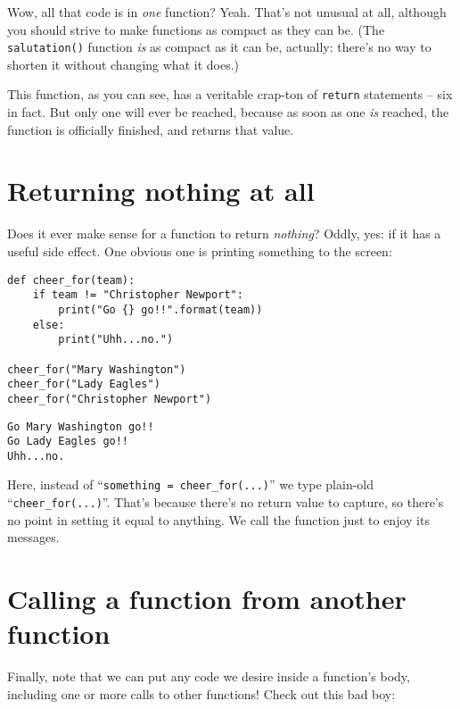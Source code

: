 Wow, all that code is in \textit{one} function? Yeah. That's not unusual at
all, although you should strive to make functions as compact as they can be.
(The \texttt{salutation()} function \textit{is} as compact as it can be,
actually: there's no way to shorten it without changing what it does.)


This function, as you can see, has a veritable crap-ton of \texttt{return}
statements -- six in fact. But only one will ever be reached, because as soon
as one \textit{is} reached, the function is officially finished, and returns
that value.

\section{Returning nothing at all}

Does it ever make sense for a function to return \textit{nothing}? Oddly, yes:
if it has a useful side effect. One obvious one is printing something to the
screen:

\begin{Verbatim}[fontsize=\small,samepage=true,frame=single,framesep=3mm]
def cheer_for(team):
    if team != "Christopher Newport":
        print("Go {} go!!".format(team))
    else:
        print("Uhh...no.")

cheer_for("Mary Washington")
cheer_for("Lady Eagles")
cheer_for("Christopher Newport")
\end{Verbatim}
\vspace{-.2in}

\begin{Verbatim}[fontsize=\small,samepage=true,frame=leftline,framesep=5mm,framerule=1mm]
Go Mary Washington go!!
Go Lady Eagles go!!
Uhh...no.
\end{Verbatim}

Here, instead of ``\texttt{something = cheer\_for(...)}'' we type plain-old
``\texttt{cheer\_for(...)}''. That's because there's no return value to
capture, so there's no point in setting it equal to anything. We call the
function just to enjoy its messages.

\section{Calling a function from another function}

Finally, note that we can put any code we desire inside a function's body,
including one or more calls to other functions! Check out this bad boy:

